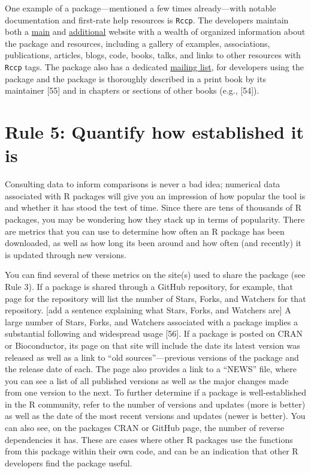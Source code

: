 \documentclass[10pt,letterpaper]{article}
\begin{document}
One example of a package---mentioned a few times already---with notable
documentation and first-rate help resources is \texttt{Rccp}. The
developers maintain both a \href{http://www.rcpp.org/}{main} and
\href{http://dirk.eddelbuettel.com/code/rcpp.html}{additional} website
with a wealth of organized information about the package and resources,
including a gallery of examples, associations, publications, articles,
blogs, code, books, talks, and links to other resources with
\texttt{Rccp} tags. The package also has a dedicated
\href{https://lists.r-forge.r-project.org/cgi-bin/mailman/listinfo/rcpp-devel}{mailing
list}, for developers using the package and the package is thoroughly
described in a print book by its maintainer {[}55{]} and in chapters or
sections of other books (e.g., {[}54{]}).

\hypertarget{rule-5-quantify-how-established-it-is}{%
\section{Rule 5: Quantify how established it
is}\label{rule-5-quantify-how-established-it-is}}

Consulting data to inform comparisons is never a bad idea; numerical
data associated with R packages will give you an impression of how
popular the tool is and whether it has stood the test of time. Since
there are tens of thousands of R packages, you may be wondering how they
stack up in terms of popularity. There are metrics that you can use to
determine how often an R package has been downloaded, as well as how
long its been around and how often (and recently) it is updated through
new versions.

You can find several of these metrics on the site(s) used to share the
package (see Rule 3). If a package is shared through a GitHub
repository, for example, that page for the repository will list the
number of Stars, Forks, and Watchers for that repository. {[}add a
sentence explaining what Stars, Forks, and Watchers are{]} A large
number of Stars, Forks, and Watchers associated with a package implies a
substantial following and widespread usage {[}56{]}. If a package is
posted on CRAN or Bioconductor, its page on that site will include the
date its latest version was released as well as a link to ``old
sources''---previous versions of the package and the release date of
each. The page also provides a link to a ``NEWS'' file, where you can
see a list of all published versions as well as the major changes made
from one version to the next. To further determine if a package is
well-established in the R community, refer to the number of versions and
updates (more is better) as well as the date of the most recent versions
and updates (newer is better). You can also see, on the packages CRAN or
GitHub page, the number of reverse dependencies it has. These are cases
where other R packages use the functions from this package within their
own code, and can be an indication that other R developers find the
package useful.
\end{document}
